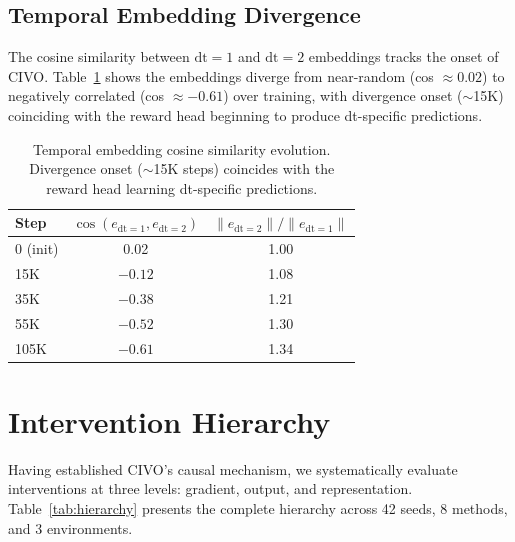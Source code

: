 \documentclass[10pt,letterpaper]{article}
\begin{document}
\subsection{Temporal Embedding Divergence}

The cosine similarity between $\mathrm{dt}=1$ and $\mathrm{dt}=2$ embeddings tracks the onset of CIVO.
Table~\ref{tab:emb_diverge} shows the embeddings diverge from near-random (cos $\approx 0.02$) to negatively correlated (cos $\approx -0.61$) over training, with divergence onset ($\sim$15K) coinciding with the reward head beginning to produce dt-specific predictions.

\begin{table}[h]
\centering
\caption{Temporal embedding cosine similarity evolution. Divergence onset ($\sim$15K steps) coincides with the reward head learning dt-specific predictions.}
\label{tab:emb_diverge}
\small
\begin{tabular}{lcc}
\toprule
Step & $\cos(e_{\mathrm{dt}=1}, e_{\mathrm{dt}=2})$ & $\|e_{\mathrm{dt}=2}\| / \|e_{\mathrm{dt}=1}\|$ \\
\midrule
0 (init) & 0.02 & 1.00 \\
15K & $-0.12$ & 1.08 \\
35K & $-0.38$ & 1.21 \\
55K & $-0.52$ & 1.30 \\
105K & $-0.61$ & 1.34 \\
\bottomrule
\end{tabular}
\end{table}

\section{Intervention Hierarchy}

Having established CIVO's causal mechanism, we systematically evaluate interventions at three levels: gradient, output, and representation.
Table~\ref{tab:hierarchy} presents the complete hierarchy across 42 seeds, 8 methods, and 3 environments.
\end{document}
